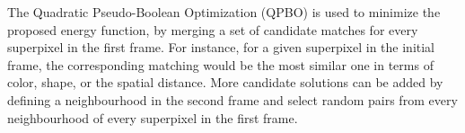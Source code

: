 The Quadratic Pseudo-Boolean Optimization (QPBO) \cite{c3}\cite{c4} is used to minimize the proposed energy function, 
by merging a set of candidate matches for every superpixel in the first frame.
For instance, for a given superpixel in the initial frame, the corresponding 
matching would be the most similar one in terms of color, shape, or the spatial distance. More candidate solutions can be added by defining a
neighbourhood in the second frame and select random pairs from every neighbourhood of every superpixel
in the first frame. %


